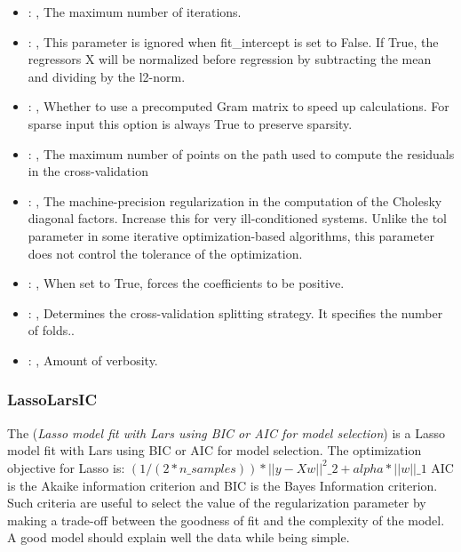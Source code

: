 \begin{itemize}
    \item {}: , 
      The maximum number of iterations.

    \item {}: , 
      This parameter is ignored when fit\_intercept is set to False. If True,
      the regressors X will be normalized before regression by subtracting the mean and
      dividing by the l2-norm.

    \item {}: , 
      Whether to use a precomputed Gram matrix to speed up calculations.
      For sparse input this option is always True to preserve sparsity.

    \item {}: , 
      The maximum number of points on the path used to compute the residuals in
      the cross-validation

    \item {}: , 
      The machine-precision regularization in the computation of the Cholesky
      diagonal factors. Increase this for very ill-conditioned systems. Unlike the tol
      parameter in some iterative optimization-based algorithms, this parameter does not
      control the tolerance of the optimization.

    \item {}: , 
      When set to True, forces the coefficients to be positive.

    \item {}: , 
      Determines the cross-validation splitting strategy.
      It specifies the number of folds..

    \item {}: , 
      Amount of verbosity.
  \end{itemize}


\subsubsection{LassoLarsIC}
  The  (\textit{Lasso model fit with Lars using BIC or AIC for model
  selection})                         is a Lasso model fit with Lars using BIC or AIC for model
  selection.                         The optimization objective for Lasso is:
  $(1 / (2 * n\_samples)) * ||y - Xw||^2\_2 + alpha * ||w||\_1$                         AIC is the
  Akaike information criterion and BIC is the Bayes Information criterion. Such criteria
  are useful to select the value of the regularization parameter by making a trade-off between the
  goodness of fit and the complexity of the model. A good model should explain well the data
  while being simple.                         

